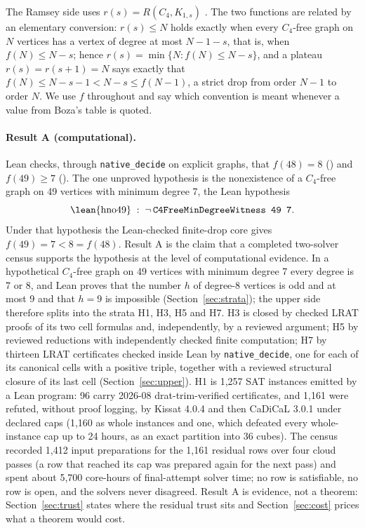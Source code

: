 \documentclass{anvil-paper}
\newcommand{\hnoFortyNine}{\lean{hno49}}
\theoremstyle{definition}
\begin{document}
The Ramsey side uses $r(s)=R(C_4,K_{1,s})$ \citep{boza2024ramsey,zhang2017polarity}. The two functions are related by an elementary conversion: $r(s)\le N$ holds exactly when every $C_4$-free graph on $N$ vertices has a vertex of degree at most $N-1-s$, that is, when $f(N)\le N-s$; hence $r(s)=\min\{N: f(N)\le N-s\}$, and a plateau $r(s)=r(s+1)=N$ says exactly that $f(N)\le N-s-1<N-s\le f(N-1)$, a strict drop from order $N-1$ to order $N$. We use $f$ throughout and say which convention is meant whenever a value from Boza's table is quoted.

\paragraph{Result A (computational).} Lean checks, through \texttt{native\_decide} on explicit graphs, that $f(48)=8$ () and $f(49)\ge 7$ (). The one unproved hypothesis is the nonexistence of a $C_4$-free graph on 49 vertices with minimum degree 7, the Lean hypothesis
\[
\text{\hnoFortyNine} \;:\; \neg\,\text{\texttt{C4FreeMinDegreeWitness 49 7}} .
\]
Under that hypothesis the Lean-checked finite-drop core gives $f(49)=7<8=f(48)$. Result A is the claim that a completed two-solver census supports the hypothesis at the level of computational evidence. In a hypothetical $C_4$-free graph on 49 vertices with minimum degree 7 every degree is 7 or 8, and Lean proves that the number $h$ of degree-8 vertices is odd and at most 9 and that $h=9$ is impossible (Section~\ref{sec:strata}); the upper side therefore splits into the strata H1, H3, H5 and H7. H3 is closed by checked LRAT proofs of its two cell formulas and, independently, by a reviewed argument; H5 by reviewed reductions with independently checked finite computation; H7 by thirteen LRAT certificates checked inside Lean by \texttt{native\_decide}, one for each of its canonical cells with a positive triple, together with a reviewed structural closure of its last cell (Section~\ref{sec:upper}). H1 is 1,257 SAT instances emitted by a Lean program: 96 carry 2026-08 drat-trim-verified certificates, and 1,161 were refuted, without proof logging, by Kissat 4.0.4 and then CaDiCaL 3.0.1 under declared caps (1,160 as whole instances and one, which defeated every whole-instance cap up to 24 hours, as an exact partition into 36 cubes). The census recorded 1,412 input preparations for the 1,161 residual rows over four cloud passes (a row that reached its cap was prepared again for the next pass) and spent about 5,700 core-hours of final-attempt solver time; no row is satisfiable, no row is open, and the solvers never disagreed. Result A is evidence, not a theorem: Section~\ref{sec:trust} states where the residual trust sits and Section~\ref{sec:cost} prices what a theorem would cost.
\end{document}
